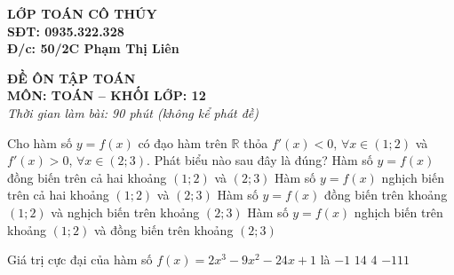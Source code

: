 \documentclass[12pt,a4paper]{article}
\begin{document}
\noindent
\begin{tcolorbox}[enhanced, colback=blue!3!white, colframe=blue!65!black, arc=2.5mm, boxrule=1.2pt, left=8pt, right=8pt, top=6pt, bottom=6pt]
\begin{minipage}[c]{0.48\textwidth}
	\begin{center}
		{\large\bfseries\color{blue!80!black} LỚP TOÁN CÔ THÚY}\\[2pt]
		\textbf{SĐT: 0935.322.328}\\[2pt]
		\textbf{Đ/c: 50/2C Phạm Thị Liên}
	\end{center}
\end{minipage}
\hfill
\begin{minipage}[c]{0.48\textwidth}
	\begin{center}
		{\large\bfseries\color{red!80!black} ĐỀ ÔN TẬP TOÁN}\\[2pt]
		\textbf{MÔN: TOÁN -- KHỐI LỚP: 12}\\[2pt]
		\textit{\small Thời gian làm bài: 90 phút (không kể phát đề)}
	\end{center}
\end{minipage}
\end{tcolorbox}

\vspace{-0.1cm}
\noindent
\hfill {}
\vspace{0.1cm}

\begin{flushleft}
	{\color{blue!50!green}}
\end{flushleft}
\setcounter{ex}{0}
\setcounter{bt}{0}

\begin{ex}
	Cho hàm số $y = f(x)$ có đạo hàm trên $\mathbb{R}$ thỏa $f'(x) < 0$, $\forall x \in \left(1; 2\right)$ và $f'(x) > 0$, $\forall x \in \left(2; 3\right)$. Phát biểu nào sau đây là đúng?
	\choice
	{Hàm số $y = f(x)$ đồng biến trên cả hai khoảng $\left(1; 2\right)$ và $\left(2; 3\right)$}
	{Hàm số $y = f(x)$ nghịch biến trên cả hai khoảng $\left(1; 2\right)$ và $\left(2; 3\right)$}
	{Hàm số $y = f(x)$ đồng biến trên khoảng $\left(1; 2\right)$ và nghịch biến trên khoảng $\left(2; 3\right)$}
	{\True Hàm số $y = f(x)$ nghịch biến trên khoảng $\left(1; 2\right)$ và đồng biến trên khoảng $\left(2; 3\right)$}
	\loigiai{}
\end{ex}

\begin{ex}
	Giá trị cực đại của hàm số $f(x) = 2x^3 - 9x^2 - 24x + 1$ là
	\choice
	{$-1$}
	{\True $14$}
	{$4$}
	{$-111$}
	\loigiai{}
\end{ex}
\end{document}
